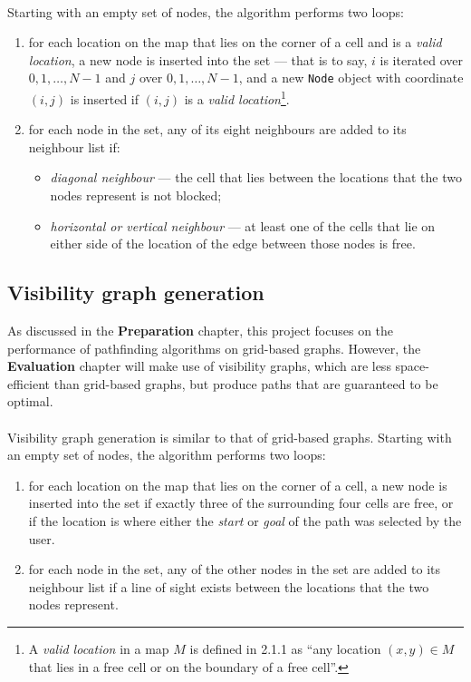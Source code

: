 \documentclass[12pt,notitlepage]{report}
\begin{document}
\\
\noindent
Starting with an empty set of nodes, the algorithm performs two loops:
\begin{enumerate}
\item for each location on the map that lies on the corner of a cell and is a {\em valid location}, a new node is inserted into the set  --- that is to say, $i$ is iterated over $0,1,\ldots,N-1$ and $j$ over $0,1,\ldots,N-1$, and a new {\tt Node} object with coordinate $(i,j)$ is inserted if $(i,j)$ is a {\em valid location}\footnote{A {\em valid location} in a map $M$ is defined in 2.1.1 as ``any location $(x,y) \in M$ that lies in a free cell or on the boundary of a free cell''.}.
\item for each node in the set, any of its eight neighbours are added to its neighbour list if:
  \begin{itemize}
  \item {\em diagonal neighbour} --- the cell that lies between the locations that the two nodes represent is not blocked;
  \item {\em horizontal or vertical neighbour} --- at least one of the cells that lie on either side of the location of the edge between those nodes is free.
  \end{itemize}
\end{enumerate}

\subsection{Visibility graph generation}
As discussed in the {\bfseries Preparation} chapter, this project focuses on the performance of pathfinding algorithms on grid-based graphs. However, the {\bfseries Evaluation} chapter will make use of visibility graphs, which are less space-efficient than grid-based graphs, but produce paths that are guaranteed to be optimal.\\

\\
\noindent
Visibility graph generation is similar to that of grid-based graphs. Starting with an empty set of nodes, the algorithm performs two loops:
\begin{enumerate}
\item for each location on the map that lies on the corner of a cell, a new node is inserted into the set if exactly three of the surrounding four cells are free, or if the location is where either the {\em start} or {\em goal} of the path was selected by the user.
\item for each node in the set, any of the other nodes in the set are added to its neighbour list if a line of sight exists between the locations that the two nodes represent.
\end{enumerate}
\end{document}

